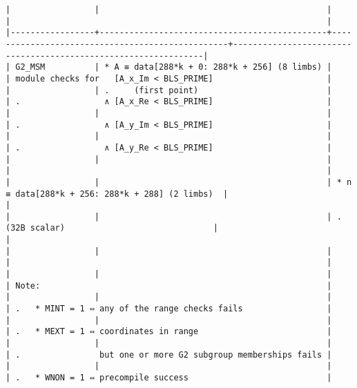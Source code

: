 \documentclass[varwidth=\maxdimen,margin=0.5cm,multi={verbatim}]{standalone}
\begin{document}
\begin{verbatim}
|                 |                                              |                                                 |                                                                |
|-----------------+----------------------------------------------+-------------------------------------------------+----------------------------------------------------------------|
| G2_MSM          | * A ≡ data[288*k + 0: 288*k + 256] (8 limbs) |                                                 | module checks for   [A_x_Im < BLS_PRIME]                       |
|                 | .     (first point)                          |                                                 | .                 ∧ [A_x_Re < BLS_PRIME]                       |
|                 |                                              |                                                 | .                 ∧ [A_y_Im < BLS_PRIME]                       |
|                 |                                              |                                                 | .                 ∧ [A_y_Re < BLS_PRIME]                       |
|                 |                                              |                                                 |                                                                |
|                 |                                              | * n ≡ data[288*k + 256: 288*k + 288] (2 limbs)  |                                                                |
|                 |                                              | .     (32B scalar)                              |                                                                |
|                 |                                              |                                                 |                                                                |
|                 |                                              |                                                 | Note:                                                          |
|                 |                                              |                                                 | .   * MINT = 1 ⇔ any of the range checks fails                 |
|                 |                                              |                                                 | .   * MEXT = 1 ⇔ coordinates in range                          |
|                 |                                              |                                                 | .                but one or more G2 subgroup memberships fails |
|                 |                                              |                                                 | .   * WNON = 1 ⇔ precompile success                            |

\end{verbatim}
\end{document}
